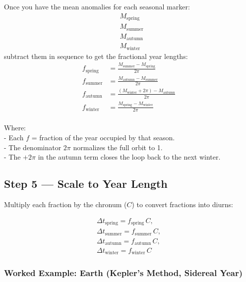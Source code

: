 \documentclass[
  letterpaper,
]{book}
\begin{document}
Once you have the mean anomalies for each seasonal marker: \[
\begin{align}
&M_\text{spring} \\
&M_\text{summer} \\
&M_\text{autumn} \\
&M_\text{winter} 
\end{align}
\] subtract them in sequence to get the fractional year lengths: \[
\begin{aligned}
f_\text{spring} &= \frac{M_\text{summer} - M_\text{spring}}{2\pi} \\[6pt]
f_\text{summer} &= \frac{M_\text{autumn} - M_\text{summer}}{2\pi} \\[6pt]
f_\text{autumn} &= \frac{(M_\text{winter}+2\pi) - M_\text{autumn}}{2\pi} \\[6pt]
f_\text{winter} &= \frac{M_\text{spring} - M_\text{winter}}{2\pi} \\[6pt]
\end{aligned}
\]

Where:\\
- Each \(f\) = fraction of the year occupied by that season.\\
- The denominator \(2\pi\) normalizes the full orbit to 1.\\
- The \(+2\pi\) in the autumn term closes the loop back to the next
winter.

\subsection{Step 5 --- Scale to Year
Length}\label{step-5-scale-to-year-length}

Multiply each fraction by the chronum (\(C\)) to convert fractions into
diurns:

\[
\begin{gather}
\Delta t_\text{spring} = f_\text{spring}\,C, \\
\Delta t_\text{summer} = f_\text{summer}\,C, \\
\Delta t_\text{autumn} = f_\text{autumn}\,C, \\
\Delta t_\text{winter} = f_\text{winter}\,C
\end{gather}
\]

\subsubsection{Worked Example: Earth (Kepler's Method, Sidereal
Year)}\label{worked-example-earth-keplers-method-sidereal-year}
\end{document}
